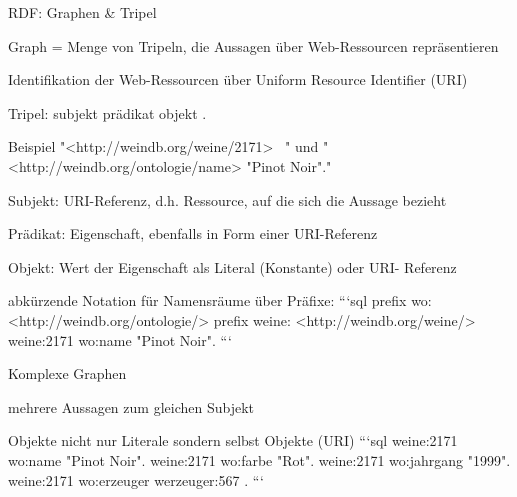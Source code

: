 \documentclass[a4paper]{article}
\begin{document}
\begin{multicols}{3}
\begin{itemize*}
    RDF: Graphen \& Tripel
    \begin{itemize*}
        \item Graph = Menge von Tripeln, die Aussagen über Web-Ressourcen repräsentieren
        \item Identifikation der Web-Ressourcen über Uniform Resource Identifier (URI)
        \item Tripel: subjekt prädikat objekt .
        \item Beispiel "<http://weindb.org/weine/2171> \ " und "<http://weindb.org/ontologie/name> "Pinot Noir"."
        \item Subjekt: URI-Referenz, d.h. Ressource, auf die sich die Aussage bezieht
        \item Prädikat: Eigenschaft, ebenfalls in Form einer URI-Referenz
        \item Objekt: Wert der Eigenschaft als Literal (Konstante) oder URI- Referenz
        \item abkürzende Notation für Namensräume über Präfixe:
        ```sql
        prefix wo: <http://weindb.org/ontologie/>
        prefix weine: <http://weindb.org/weine/>
        weine:2171 wo:name "Pinot Noir".
        ```
        \item Komplexe Graphen
        \begin{itemize*}
            \item mehrere Aussagen zum gleichen Subjekt
            \item Objekte nicht nur Literale sondern selbst Objekte (URI)
            ```sql
            weine:2171 wo:name "Pinot Noir".
            weine:2171 wo:farbe "Rot".
            weine:2171 wo:jahrgang "1999".
            weine:2171 wo:erzeuger werzeuger:567 .
            ```
        \end{itemize*}
    \end{itemize*}


\end{itemize*}
\end{multicols}
\end{document}
